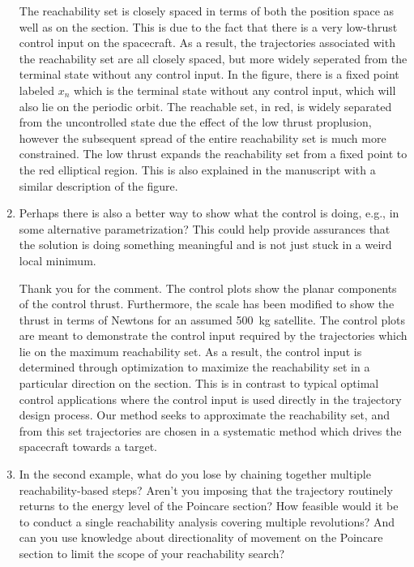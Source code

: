 \documentclass[11pt]{article}
\begin{document}
\begin{enumerate}
The reachability set is closely spaced in terms of both the position space as well as on the \Poincare section.
This is due to the fact that there is a very low-thrust control input on the spacecraft.
As a result, the trajectories associated with the reachability set are all closely spaced, but more widely seperated from the terminal state without any control input.
In the figure, there is a fixed point labeled \( x_n \) which is the terminal state without any control input, which will also lie on the periodic orbit.
The reachable set, in red, is widely separated from the uncontrolled state due the effect of the low thrust proplusion, however the subsequent spread of the entire reachability set is much more constrained.
The low thrust expands the reachability set from a fixed point to the red elliptical region. 
This is also explained in the manuscript with a similar description of the figure.

\item
    \begin{itshape}
Perhaps there is also a better way to show what the control is doing, e.g., in some alternative parametrization?  This could help provide assurances that the solution is doing something meaningful and is not just stuck in a weird local minimum.  
\end{itshape}

Thank you for the comment.
The control plots show the planar components of the control thrust. 
Furthermore, the scale has been modified to show the thrust in terms of Newtons for an assumed \SI{500}{\kilo\gram} satellite.
The control plots are meant to demonstrate the control input required by the trajectories which lie on the maximum reachability set. 
As a result, the control input is determined through optimization to maximize the reachability set in a particular direction on the \Poincare section.
This is in contrast to typical optimal control applications where the control input is used directly in the trajectory design process.
Our method seeks to approximate the reachability set, and from this set trajectories are chosen in a systematic method which drives the spacecraft towards a target.

\item
    \begin{itshape}
In the second example, what do you lose by chaining together multiple reachability-based steps?  Aren't you imposing that the trajectory routinely returns to the energy level of the Poincare section? How feasible would it be to conduct a single reachability analysis covering multiple revolutions? And can you use knowledge about directionality of movement on the Poincare section to limit the scope of your reachability search?
\end{itshape}


\end{enumerate}
\end{document}
